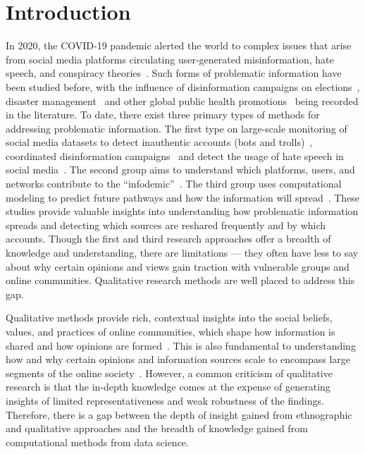
\section{Introduction}


In 2020, the COVID-19 pandemic alerted the world to complex issues that arise from social media platforms circulating user-generated misinformation, hate speech, and conspiracy theories~\citep{posetti2020disinfodemic}.
Such forms of problematic information \citep{jack2017lexicon} have been studied before, with the influence of disinformation campaigns on elections~\citep{Kim2019}, disaster management~\citep{rajdev2015fake} and other global public health promotions~\citep{bode2018see} being recorded in the literature. 
To date, there exist three primary types of methods for addressing problematic information.
The first type  on large-scale monitoring of social media datasets to detect inauthentic accounts (bots and trolls)~\citep{kong2020modeling,kong2020describing,Ram2021a}, coordinated disinformation campaigns~\citep{Rizoiu2018a} and detect the usage of hate speech in social media~\citep{Rizoiu2019}.
The second group aims to understand which platforms, users, and networks contribute to the ``infodemic''~\citep{smith2019mapping,bruns2020covid19,colley2020challenges}.
The third group uses computational modeling to predict future pathways and how the information will spread~\citep{molina2019fake}. 
These studies provide valuable insights into understanding how problematic information spreads and detecting which sources are reshared frequently and by which accounts.
Though the first and third research approaches offer a breadth of knowledge and understanding, there are limitations --- they often have less to say about why certain opinions and views gain traction with vulnerable groups and online communities. Qualitative research methods are well placed to address this gap.

Qualitative methods provide rich, contextual insights into the social beliefs, values, and practices of online communities, which shape how information is shared and how opinions are formed~\citep{boyd2010social,baym2015personal,johns2020will,wu2021cross}.
This is also fundamental to understanding how and why certain opinions and information sources scale to encompass large segments of the online society~\citep{bailo2020online,bruns2020covid19}.
However, a common criticism of qualitative research is that the in-depth knowledge comes at the expense of generating insights of limited representativeness and weak robustness of the findings.
Therefore, there is a gap between the depth of insight gained from ethnographic and qualitative approaches and the breadth of knowledge gained from computational methods from data science.

